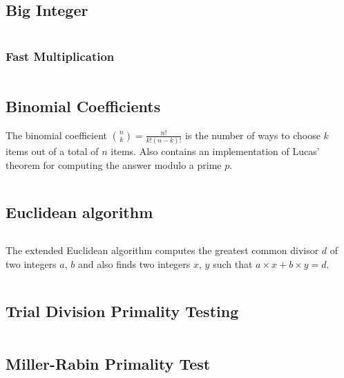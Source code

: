 \documentclass[9pt,a4paper,twocolumn,landscape,oneside]{amsart}
\newcommand{\code}[1]{\inputminted{cpp}{_code/#1}}
\newif\ifverbose
\begin{document}
    \subsection{Big Integer}
        \ifverbose
        A big integer class.
        \fi
        \code{mathematics/intx.cpp}

        \subsubsection{Fast Multiplication}
            \ifverbose
            Fast multiplication for the big integer using Fast Fourier Transform.
            \fi
            \code{mathematics/fastmul.cpp}

    \subsection{Binomial Coefficients}
        The binomial coefficient $\binom{n}{k} = \frac{n!}{k!(n-k)!}$ is the
        number of ways to choose $k$ items out of a total of $n$ items. Also
        contains an implementation of Lucas' theorem for computing the answer
        modulo a prime $p$.
        \code{mathematics/nck.cpp}

    \subsection{Euclidean algorithm}
        \ifverbose
        The Euclidean algorithm computes the greatest common divisor of two
        integers $a$, $b$.
        \fi
        \code{mathematics/gcd.cpp}

        The extended Euclidean algorithm computes the greatest common divisor
        $d$ of two integers $a$, $b$ and also finds two integers $x$, $y$ such
        that $a\times x + b\times y = d$.
        \code{mathematics/egcd.cpp}

    \subsection{Trial Division Primality Testing}
        \ifverbose
        An optimized trial division to check whether an integer is prime.
        \fi
        \code{mathematics/is_prime.cpp}

    \subsection{Miller-Rabin Primality Test}
        \ifverbose
        The Miller-Rabin probabilistic primality test.
        \fi
        \code{mathematics/miller_rabin.cpp}
\end{document}
